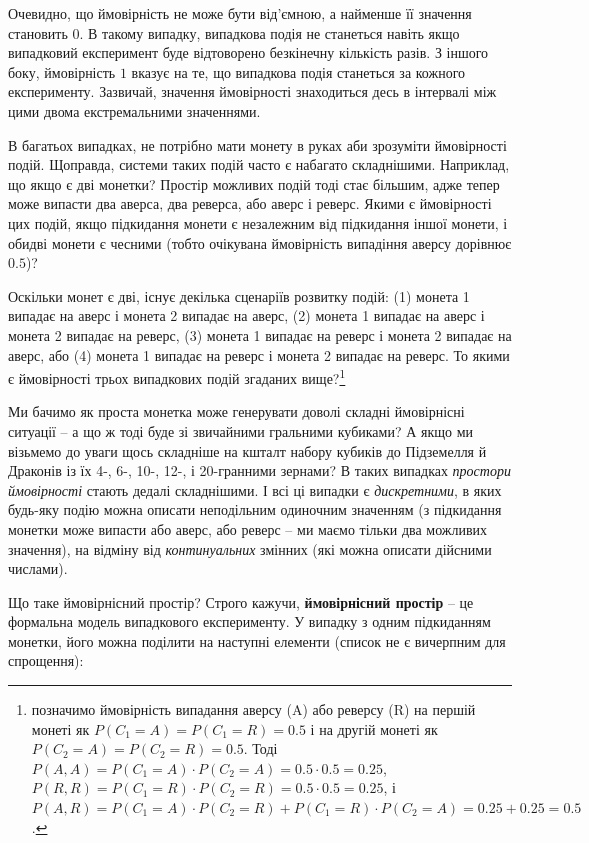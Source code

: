 \documentclass[
  11pt,
]{book}
\begin{document}
Очевидно, що ймовірність не може бути від'ємною, а найменше її значення
становить \(0\). В такому випадку, випадкова подія не станеться навіть
якщо випадковий експеримент буде відтоворено безкінечну кількість разів.
З іншого боку, ймовірність \(1\) вказує на те, що випадкова подія
станеться за кожного експерименту. Зазвичай, значення ймовірності
знаходиться десь в інтервалі між цими двома екстремальними значеннями.

В багатьох випадках, не потрібно мати монету в руках аби зрозуміти
ймовірності подій. Щоправда, системи таких подій часто є набагато
складнішими. Наприклад, що якщо є дві монетки? Простір можливих подій
тоді стає більшим, адже тепер може випасти два аверса, два реверса, або
аверс і реверс. Якими є ймовірності цих подій, якщо підкидання монети є
незалежним від підкидання іншої монети, і обидві монети є чесними (тобто
очікувана ймовірність випадіння аверсу дорівнює \(0.5\))?

Оскільки монет є дві, існує декілька сценаріїв розвитку подій: (1)
монета 1 випадає на аверс і монета 2 випадає на аверс, (2) монета 1
випадає на аверс і монета 2 випадає на реверс, (3) монета 1 випадає на
реверс і монета 2 випадає на аверс, або (4) монета 1 випадає на реверс і
монета 2 випадає на реверс. То якими є ймовірності трьох випадкових
подій згаданих вище?\footnote{позначимо ймовірність випадання аверсу (A)
  або реверсу (R) на першій монеті як \(P(C_1 = A) = P(C_1 = R) = 0.5\)
  і на другій монеті як \(P(C_2 = A) = P(C_2 = R) = 0.5\). Тоді
  \(P(A, A) = P(C_1 = A) \cdot P(C_2 =  A) = 0.5 \cdot 0.5 = 0.25\),
  \(P(R, R) = P(C_1 = R) \cdot P(C_2 =  R) = 0.5 \cdot 0.5 = 0.25\), і
  \(P(A, R) = P(C_1 = A) \cdot P(C_2 = R) + P(C_1 = R) \cdot P(C_2 = A) = 0.25 + 0.25 = 0.5\).}

Ми бачимо як проста монетка може генерувати доволі складні ймовірнісні
ситуації -- а що ж тоді буде зі звичайними гральними кубиками? А якщо ми
візьмемо до уваги щось складніше на кшталт набору кубиків до Підземелля
й Драконів із їх 4-, 6-, 10-, 12-, і 20-гранними зернами? В таких
випадках \emph{простори ймовірності} стають дедалі складнішими. І всі ці
випадки є \emph{дискретними}, в яких будь-яку подію можна описати
неподільним одиночним значенням (з підкидання монетки може випасти або
аверс, або реверс -- ми маємо тільки два можливих значення), на відміну
від \emph{континуальних} змінних (які можна описати дійсними числами).

Що таке ймовірнісний простір? Строго кажучи, \textbf{ймовірнісний
простір} -- це формальна модель випадкового експерименту. У випадку з
одним підкиданням монетки, його можна поділити на наступні елементи
(список не є вичерпним для спрощення):
\end{document}
